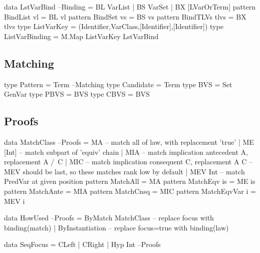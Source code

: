 \begin{code}
data LstVarBind                                                      --Binding
 = BL  VarList
 | BS  VarSet
 | BX  [LVarOrTerm]
pattern BindList vl      =  BL vl
pattern BindSet  vs      =  BS vs
pattern BindTLVs tlvs    =  BX tlvs
type ListVarKey = (Identifier,VarClass,[Identifier],[Identifier])
type ListVarBinding = M.Map ListVarKey LstVarBind
\end{code}

\subsection{Matching}

\begin{code}
type Pattern = Term                                                 --Matching
type Candidate = Term
type BVS = Set GenVar
type PBVS = BVS
type CBVS = BVS
\end{code}


\subsection{Proofs}

\begin{code}
data MatchClass                                                       --Proofs
  = MA       -- match all of law, with replacement 'true'
  | ME [Int] -- match subpart of 'equiv' chain
  | MIA      -- match implication antecedent A, replacement A /\ C
  | MIC      -- match implication consequent C, replacement A \/ C
  -- MEV should be last, so these matches rank low by default
  | MEV Int  -- match PredVar at given position
pattern MatchAll       = MA
pattern MatchEqv is    = ME is
pattern MatchAnte      = MIA
pattern MatchCnsq      = MIC
pattern MatchEqvVar i  = MEV i
\end{code}

\begin{code}
data HowUsed                                                          --Proofs
  = ByMatch MatchClass  -- replace focus with binding(match)
  | ByInstantiation     -- replace focus=true with binding(law)
\end{code}

\begin{code}
data SeqFocus = CLeft | CRight | Hyp Int                              --Proofs
\end{code}

